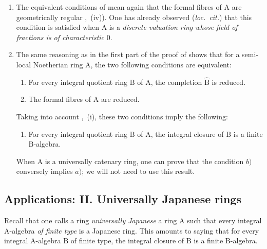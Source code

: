 \begin{remarks}[7.6.7]
\label{IV.7.6.7}
\begin{enumerate}[label=\emph{\roman*)}]
  \item The equivalent conditions of  mean again that the formal fibres of $\mathrm{A}$ are geometrically regular ,~(iv)). One has already observed (\emph{loc.\ cit.}) that this condition is satisfied when $\mathrm{A}$ is a \emph{discrete valuation ring whose field of fractions is of characteristic} $0$.

  \item The same reasoning as in the first part of the proof of  shows that for a semi-local Noetherian ring $\mathrm{A}$, the two following conditions are equivalent:
\begin{enumerate}[label=\emph{\alph*)}]
  \item For every integral quotient ring $\mathrm{B}$ of $\mathrm{A}$, the completion $\widehat{\mathrm{B}}$ is reduced.
  \item[\rm a$'$)] The formal fibres of $\mathrm{A}$ are reduced.
\end{enumerate}
Taking into account ,~(i), these two conditions imply the following:
\begin{enumerate}[label=\emph{\alph*)}]
  \item[b)] For every integral quotient ring $\mathrm{B}$ of $\mathrm{A}$, the integral closure of $\mathrm{B}$ is a finite $\mathrm{B}$-algebra.
\end{enumerate}
When $\mathrm{A}$ is a universally catenary ring, one can prove that the condition $b)$ conversely implies $a)$; we will not need to use this result.
\end{enumerate}
\end{remarks}


\subsection{Applications: II. Universally Japanese rings}
\label{subsection:IV.7.7}

\begin{env}[7.7.1]
\label{IV.7.7.1}
Recall  that one calls a ring \emph{universally Japanese} a ring $\mathrm{A}$ such that every integral $\mathrm{A}$-algebra \emph{of finite type} is a Japanese ring. This amounts to saying that for every integral $\mathrm{A}$-algebra $\mathrm{B}$ of finite type, the integral closure of $\mathrm{B}$ is a finite $\mathrm{B}$-algebra.
\end{env}

